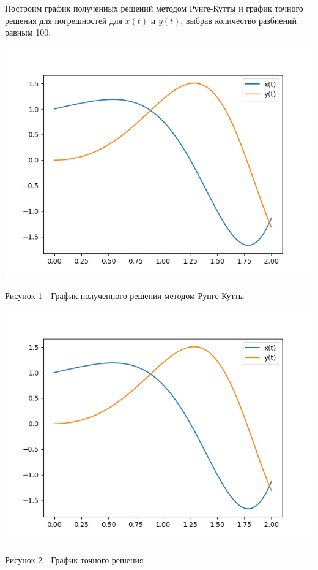 \documentclass[a4paper,14pt]{extreport}
\begin{document}
Построим график полученных решений методом Рунге-Кутты и график точного решения для погрешностей для $x(t)$ и $y(t)$, выбрав количество разбиений равным 100.

\begin{center}
\begin{minipage}[htb]{0.8\linewidth}
\includegraphics[width=14cm]{1.png}
\end{minipage}
\end{center}
\begin{center}
Рисунок 1 - График полученного решения методом Рунге-Кутты
\end{center}
\begin{center}
\begin{minipage}[htb]{0.8\linewidth}
\includegraphics[width=14cm]{2.png}
\end{minipage}
\end{center}
\begin{center}
Рисунок 2 -  График точного решения
\end{center}
\end{document}

